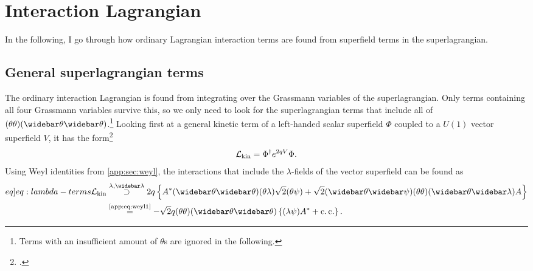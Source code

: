 \documentclass[english, notitlepage]{article}
\begin{document}
\section{Interaction Lagrangian}
    In the following, I go through how ordinary Lagrangian interaction terms are found from superfield terms in the superlagrangian.
    \subsection{General superlagrangian terms}
        The ordinary interaction Lagrangian is found from integrating over the
        Grassmann variables of the superlagrangian.
        Only terms containing all four Grassmann variables survive this, so we only need to look for the superlagrangian terms that include all of $(\theta\theta)(\wbar\theta\wbar\theta)$.\footnote{Terms with an insufficient amount of $\theta$s are ignored in the following.}
        Looking first at a general kinetic term of a left-handed scalar superfield \(\Phi\) coupled to a $U(1)$ vector superfield \(V\), it has the form\footcite{Binetruy:2006ad}
        \begin{align}
            {\mathcal{L}}_\text{kin} = \Phi^\dag e^{2qV} \Phi.
        \end{align}
        Using Weyl identities from \cref{app:sec:weyl}, the interactions that include the $\lambda$-fields of the vector superfield can be found as
        \begin{align}
            \label[eq]{eq:lambda-terms}
            \nonumber
            \msub{\L}{kin} & \stackrel{\lambda, \wbar\lambda}{\supset} 2q\cclosed{ A^* (\wbar\theta\wbar\theta)(\theta\lambda) \sqrt{2} (\theta\psi) + \sqrt{2} (\wbar\theta\wbar\psi) (\theta\theta)(\wbar\theta\wbar\lambda) A } \\
                           & \stackrel{\text{\cref{app:eq:weyl1}}}{=} -\sqrt{2}q (\theta\theta)(\wbar\theta\wbar\theta) \cclosed{ (\lambda\psi)A^* + \cc }.
        \end{align}
\end{document}
